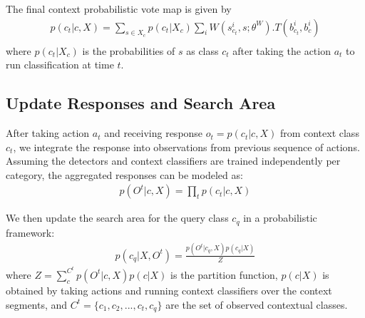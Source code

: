 The final context probabilistic vote map is given by
\begin{eqnarray}
p(c_t|c,X) = \sum_{s\in X_c} p(c_t|X_c)\sum_i W(s_{c_t}^i,s;\theta^W).T(b_{c_t}^i,b_c^i)\nonumber\\
\end{eqnarray}
where $p(c_t|X_c)$ is the probabilities of $s$ as class $c_t$ after taking the action $a_t$ to run classification at time $t$.


\subsection{Update Responses and Search Area}
After taking action $a_t$ and receiving response $o_t = p(c_t|c, X)$ from context class $c_t$, we integrate the response into observations from previous sequence of actions. Assuming the detectors and context classifiers are trained independently per category, the aggregated responses can be modeled as:
\begin{eqnarray}
p(O^t|c, X) = \prod_t p(c_t|c,X)
\end{eqnarray}

We then update the search area for the query class $c_q$ in a probabilistic framework:
\begin{eqnarray}
p(c_q|X,O^t) = \frac{p(O^t|c_q,X)p(c_q|X)}{Z}
\end{eqnarray}
where $Z = \sum_c^{C^t} p(O^t|c,X)p(c|X)$ is the partition function, $p(c|X)$ is obtained by taking actions and running context classifiers over the context segments,  and $C^t = \{c_1, c_2, ..., c_t, c_q\}$ are the set of observed contextual classes.
